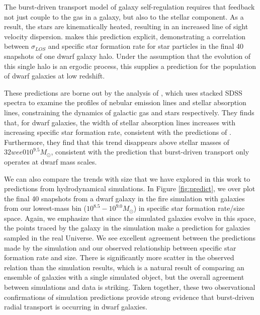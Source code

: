 \documentclass[iop]{emulateapj}
\begin{document}
The burst-driven transport model of galaxy self-regulation requires that feedback not just couple to the gas in a galaxy, but also to the stellar component. As a result, the stars are kinematically heated, resulting in an increased line of sight velocity dispersion. \cite{El-Badry17} makes this prediction explicit, demonstrating a correlation between $\sigma_{LOS}$ and specific star formation rate for star particles in the final 40 snapshots of one dwarf galaxy halo. Under the assumption that the evolution of this single halo is an ergodic process, this supplies a prediction for the population of dwarf galaxies at low redshift.

These predictions are borne out by the analysis of \cite{Cicone16}, which uses stacked SDSS spectra to examine the profiles of nebular emission lines and stellar absorption lines, constraining the dynamics of galactic gas and stars respectively. They finds that, for dwarf galaxies, the width of stellar absorption lines increases with increasing specific star formation rate, consistent with the predictions of \cite{El-Badry17}. Furthermore, they find that this trend disappears above stellar masses of $32wee010^{9.5} M_{\odot}$, consistent with the prediction that burst-driven transport only operates at dwarf mass scales.

We can also compare the trends with size that we have explored in this work to predictions from hydrodynamical simulations. In Figure \ref{fig:predict}, we over plot the final 40 snapshots from a dwarf galaxy in the fire simulation with galaxies from our lowest-mass bin ($10^{8.5}-10^{9.0} M_{\odot}$) in specific star formation rate/size space. Again, we emphasize that since the simulated galaxies evolve in this space, the points traced by the galaxy in the simulation make a prediction for galaxies sampled in the real Universe. We see excellent agreement between the predictions made by the simulation and our observed relationship between specific star formation rate and size. There is significantly more scatter in the observed relation than the simulation results, which is a natural result of comparing an ensemble of galaxies with a single simulated object, but the overall agreement between simulations and data is striking. Taken together, these two observational confirmations of simulation predictions provide strong evidence that burst-driven radial transport is occurring in dwarf galaxies.
\end{document}

